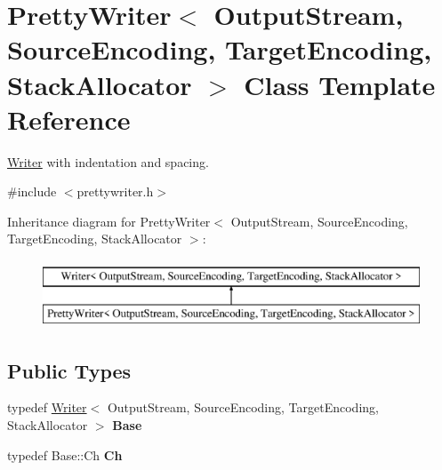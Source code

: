 \hypertarget{class_pretty_writer}{}\section{Pretty\+Writer$<$ Output\+Stream, Source\+Encoding, Target\+Encoding, Stack\+Allocator $>$ Class Template Reference}
\label{class_pretty_writer}


\hyperlink{class_writer}{Writer} with indentation and spacing.  




{\ttfamily \#include $<$prettywriter.\+h$>$}

Inheritance diagram for Pretty\+Writer$<$ Output\+Stream, Source\+Encoding, Target\+Encoding, Stack\+Allocator $>$\+:\begin{figure}[H]
\begin{center}
\leavevmode
\includegraphics[height=2.000000cm]{class_pretty_writer}
\end{center}
\end{figure}
\subsection*{Public Types}
\begin{DoxyCompactItemize}
\item 
\hypertarget{class_pretty_writer_ab6074f4c51db129e195bc5752eb2b448}{}typedef \hyperlink{class_writer}{Writer}$<$ Output\+Stream, Source\+Encoding, Target\+Encoding, Stack\+Allocator $>$ {\bfseries Base}\label{class_pretty_writer_ab6074f4c51db129e195bc5752eb2b448}

\item 
\hypertarget{class_pretty_writer_ae5f474c0f087932d795c1cb4b9d0c312}{}typedef Base\+::\+Ch {\bfseries Ch}\label{class_pretty_writer_ae5f474c0f087932d795c1cb4b9d0c312}

\end{DoxyCompactItemize}
